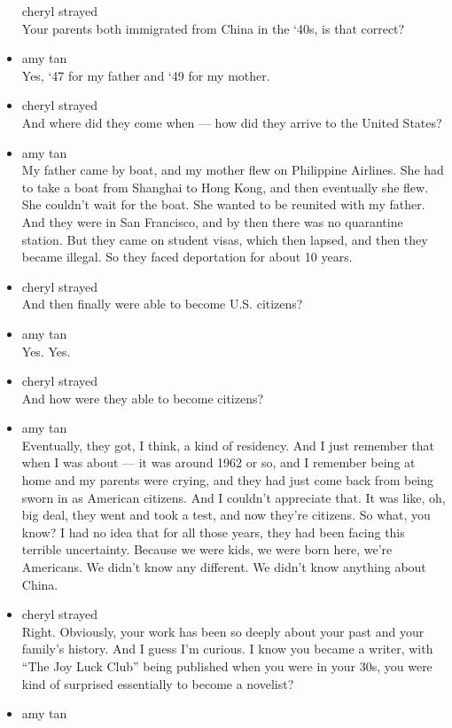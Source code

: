 \begin{itemize}
  cheryl strayed\\
  Your parents both immigrated from China in the `40s, is that correct?
\item
  amy tan\\
  Yes, `47 for my father and `49 for my mother.
\item
  cheryl strayed\\
  And where did they come when --- how did they arrive to the United
  States?
\item
  amy tan\\
  My father came by boat, and my mother flew on Philippine Airlines. She
  had to take a boat from Shanghai to Hong Kong, and then eventually she
  flew. She couldn't wait for the boat. She wanted to be reunited with
  my father. And they were in San Francisco, and by then there was no
  quarantine station. But they came on student visas, which then lapsed,
  and then they became illegal. So they faced deportation for about 10
  years.
\item
  cheryl strayed\\
  And then finally were able to become U.S. citizens?
\item
  amy tan\\
  Yes. Yes.
\item
  cheryl strayed\\
  And how were they able to become citizens?
\item
  amy tan\\
  Eventually, they got, I think, a kind of residency. And I just
  remember that when I was about --- it was around 1962 or so, and I
  remember being at home and my parents were crying, and they had just
  come back from being sworn in as American citizens. And I couldn't
  appreciate that. It was like, oh, big deal, they went and took a test,
  and now they're citizens. So what, you know? I had no idea that for
  all those years, they had been facing this terrible uncertainty.
  Because we were kids, we were born here, we're Americans. We didn't
  know any different. We didn't know anything about China.
\item
  cheryl strayed\\
  Right. Obviously, your work has been so deeply about your past and
  your family's history. And I guess I'm curious. I know you became a
  writer, with ``The Joy Luck Club'' being published when you were in
  your 30s, you were kind of surprised essentially to become a novelist?
\item
  amy tan\\

\end{itemize}
